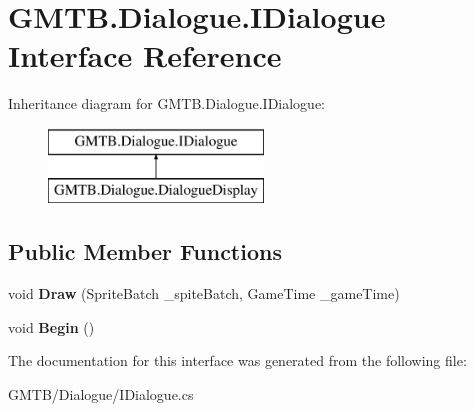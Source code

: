 \hypertarget{interface_g_m_t_b_1_1_dialogue_1_1_i_dialogue}{}\section{G\+M\+T\+B.\+Dialogue.\+I\+Dialogue Interface Reference}
\label{interface_g_m_t_b_1_1_dialogue_1_1_i_dialogue}
Inheritance diagram for G\+M\+T\+B.\+Dialogue.\+I\+Dialogue\+:\begin{figure}[H]
\begin{center}
\leavevmode
\includegraphics[height=2.000000cm]{interface_g_m_t_b_1_1_dialogue_1_1_i_dialogue}
\end{center}
\end{figure}
\subsection*{Public Member Functions}
\begin{DoxyCompactItemize}
\item 
\mbox{\label{interface_g_m_t_b_1_1_dialogue_1_1_i_dialogue_ad436bd839f77a6725dee0c8cddc5b6af}} 
void {\bfseries Draw} (Sprite\+Batch \+\_\+spite\+Batch, Game\+Time \+\_\+game\+Time)
\item 
\mbox{\label{interface_g_m_t_b_1_1_dialogue_1_1_i_dialogue_aac05e269ea11c8038d67c87f299ad40b}} 
void {\bfseries Begin} ()
\end{DoxyCompactItemize}


The documentation for this interface was generated from the following file\+:\begin{DoxyCompactItemize}
\item 
G\+M\+T\+B/\+Dialogue/I\+Dialogue.\+cs\end{DoxyCompactItemize}
